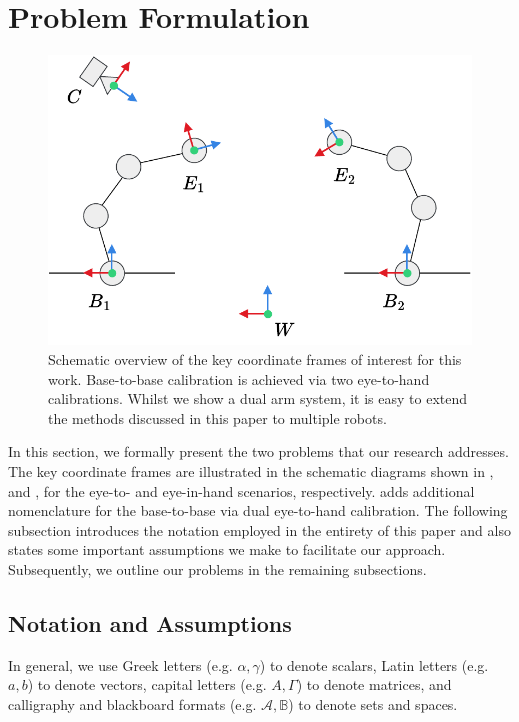 \section{Problem Formulation}
\begin{figure}[tb]
    \centering
    \includegraphics[width=\textwidth]{chapter_1/fig/eye_in_to_hand.pdf}
    \caption{
    Schematic overview of the key coordinate frames of interest for this work. Base-to-base calibration is achieved via two eye-to-hand calibrations. Whilst we show a dual arm system, it is easy to extend the methods discussed in this paper to multiple robots.
    }
    \label{c1:fig:base2base}
\end{figure}
In this section, we formally present the two problems that our research addresses. The key coordinate frames are illustrated in the schematic diagrams shown in , and , for the eye-to- and eye-in-hand scenarios, respectively.  adds additional nomenclature for the base-to-base via dual eye-to-hand calibration. The following subsection introduces the notation employed in the entirety of this paper and also states some important assumptions we make to facilitate our approach. 
Subsequently, we outline our problems in the remaining subsections.

\subsection{Notation and Assumptions}
In general, we use 
Greek letters (e.g. $\alpha, \gamma$) to denote scalars, 
Latin letters (e.g. $a, b$) to denote vectors, 
capital letters (e.g. $A, \Gamma$) to denote matrices, and 
calligraphy and blackboard formats (e.g. $\mathcal{A}, \mathbb{B}$) to denote sets and spaces.

